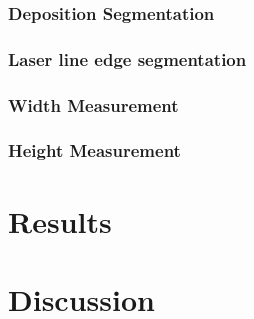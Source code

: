 \subsection*{Deposition Segmentation}

\subsection*{Laser line edge segmentation}

\subsection*{Width Measurement}

\subsection*{Height Measurement}


\chapter*{Results}



\chapter*{Discussion}


